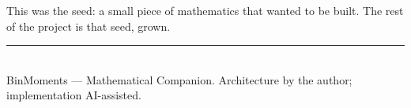 \documentclass[11pt]{article}
\theoremstyle{definition}
\begin{document}
This was the seed: a small piece of mathematics that wanted to be built. The rest of the project is
that seed, grown.

\vfill
\begin{center}
{\color{soft}\rule{0.4\textwidth}{0.4pt}}\\[0.4em]
{\scriptsize\color{soft} BinMoments --- Mathematical Companion. Architecture by the author;
implementation AI-assisted.}
\end{center}
\end{document}

